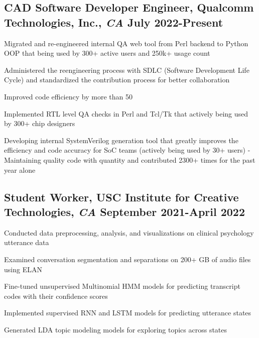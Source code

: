 \documentclass[11pt]{article}
\begin{document}
\subsection*{CAD Software Developer Engineer{\normalfont, Qualcomm Technologies, Inc.,
            \textit{CA} \hfill
            July 2022-Present}}
\begin{compactitem}
    \item Migrated and re-engineered internal QA web tool from Perl backend to Python OOP that being used by 300+ active users and 250k+ usage count
    \item Administered the reengineering process with SDLC (Software Development Life Cycle) and standardized the contribution process for better collaboration
    \item Improved code efficiency by more than 50%
    \item Implemented RTL level QA checks in Perl and Tcl/Tk that actively being used by 300+ chip designers
    \item Developing internal SystemVerilog generation tool that greatly improves the efficiency and code accuracy for SoC teams (actively being used by 30+ users)
- Maintaining quality code with quantity and contributed 2300+ times for the past year alone
\end{compactitem}

\subsection*{Student Worker{\normalfont, USC Institute for Creative
            Technologies,
            \textit{CA} \hfill
            September 2021-April 2022}}
\begin{compactitem}
    \item Conducted data preprocessing, analysis, and visualizations on clinical psychology utterance data
    \item Examined conversation segmentation and separations on 200+ GB of audio files using ELAN
    \item Fine-tuned unsupervised Multinomial HMM models for predicting transcript codes with their confidence scores
    \item Implemented supervised RNN and LSTM models for predicting utterance states
    \item Generated LDA topic modeling models for exploring topics across states
\end{compactitem}
\end{document}
